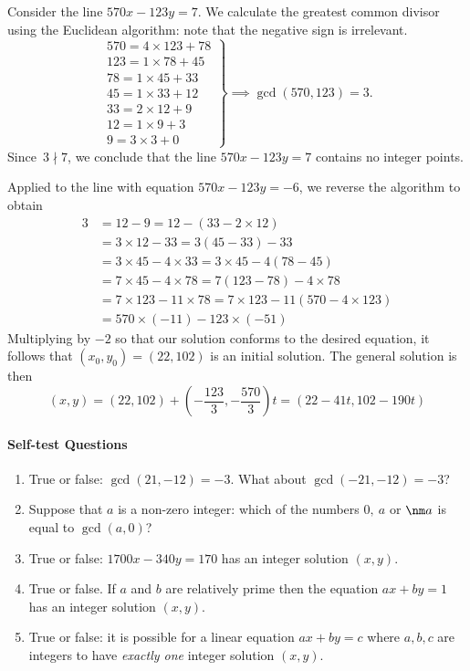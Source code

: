 \begin{examples}
  \item Consider the line $570x-123y=7$. We calculate the greatest common divisor using the Euclidean algorithm: note that the negative sign is irrelevant.
  \[\renewcommand{\arraystretch}{1.1}\left.\begin{array}{l}
	570=4\times 123+78\\
	123=1\times 78+45\\
	78=1\times 45+33\\
	45=1\times 33+12\\
	33=2\times 12+9\\
	12=1\times 9+3\\
	9=3\times 3+0
  \end{array}\right\}\implies\gcd(570,123)=3.\]
  Since $\,3\nmid 7$, we conclude that the line $570 x-123 y=7$ contains no integer points.
  \item Applied to the line with equation $570x-123y=-6$, we reverse the algorithm to obtain
  \begin{align*}
  3&=12-9=12-(33-2\times 12)\\
  &=3\times 12-33=3(45-33)-33\\
  &=3\times 45-4\times 33=3\times 45-4(78-45)\\
  &=7\times 45-4\times 78=7(123-78)-4\times 78\\
  &=7\times 123-11\times 78=7\times 123-11(570-4\times 123)\\
  &=570\times (-11)-123\times (-51)
  \end{align*}
  Multiplying by $-2$ so that our solution conforms to the desired equation, it follows that $(x_0,y_0)=(22,102)$ is an initial solution. The general solution is then
  \[(x,y)=(22,102)+\left(-\frac{123}3,-\frac{570}3\right)t=(22-41t,102-190t)\]
\end{examples}

\paragraph{Self-test Questions}

\begin{enumerate}
  \item True or false: $\gcd(21,-12)=-3$. What about $\gcd(-21,-12)=-3$?
  \item Suppose that $a$ is a non-zero integer: which of the numbers $0,\ a$ or $\nm a$ is equal to $\gcd(a,0)$?
  \item True or false: $1700x-340y=170$ has an integer solution $(x,y)$.
  \item True or false. If $a$ and $b$ are relatively prime then the equation $ax+by=1$ has an integer solution $(x,y)$.
  \item True or false: it is possible for a linear equation $ax+by=c$ where $a,b,c$ are integers to have \emph{exactly one} integer solution $(x,y)$.
\end{enumerate}\pagebreak

